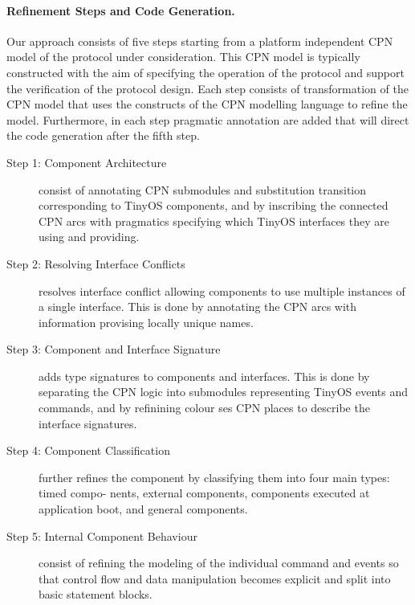 \documentclass{llncs}
\begin{document}
\paragraph{\textbf{Refinement Steps and Code Generation.}}

Our approach consists of five steps starting from a platform
independent CPN model of the protocol under consideration. This CPN
model is typically constructed with the aim of specifying the
operation of the protocol and support the verification of the protocol
design. Each step consists of transformation of the CPN model that
uses the constructs of the CPN modelling language to refine the
model. Furthermore, in each step pragmatic annotation are added that
will direct the code generation after the fifth step.

\begin{description}
\item[Step 1: Component Architecture] consist of annotating CPN
  submodules and substitution transition corresponding to TinyOS
  components, and by inscribing the connected CPN arcs with pragmatics
  specifying which TinyOS interfaces they are using and providing.

\item[Step 2: Resolving Interface Conflicts] resolves interface
  conflict allowing components to use multiple instances of a single
  interface. This is done by annotating the CPN arcs with information
  provising locally unique names.

\item[Step 3: Component and Interface Signature] adds type signatures
  to components and interfaces. This is done by separating the CPN
  logic into submodules representing TinyOS events and commands, and
  by refinining colour ses CPN places to describe the interface
  signatures.

\item[Step 4: Component Classification] further refines the component
  by classifying them into four main types: timed compo- nents,
  external components, components executed at application boot, and
  general components.

\item[Step 5: Internal Component Behaviour] consist of refining the
  modeling of the individual command and events so that control flow
  and data manipulation becomes explicit and split into basic
  statement blocks.

\end{description}
\end{document}
